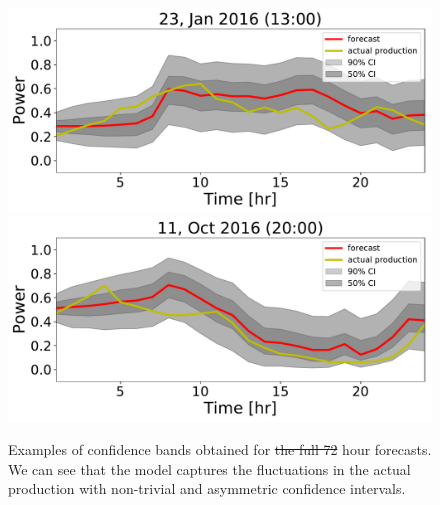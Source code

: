 \documentclass[ima, 20pt, portrait, plainboxedsections]{sciposter}
\providecommand{\DIFadd}[1]{{\protect\color{blue}\uwave{#1}}} %
\providecommand{\DIFdel}[1]{{\protect\color{red}\sout{#1}}}                      %
\providecommand{\DIFaddbegin}{} %
\providecommand{\DIFaddFL}[1]{\DIFadd{#1}} %
\providecommand{\DIFdelFL}[1]{\DIFdel{#1}} %
\providecommand{\DIFaddbeginFL}{} %
\providecommand{\DIFaddendFL}{} %
\providecommand{\DIFdelbeginFL}{} %
\providecommand{\DIFdelendFL}{} %
\begin{document}
\begin{multicols}{3}
\DIFaddbegin \begin{figure}[t]
\begin{center}
  \includegraphics[width=0.8\linewidth]{confidence_intervals/24hr/31.pdf}
  \includegraphics[width=0.8\linewidth]{confidence_intervals/24hr/820.pdf}

\DIFaddendFL \end{center}
  \caption{ Examples of confidence bands obtained for \DIFdelbeginFL \DIFdelFL{the full 72 }\DIFdelendFL \DIFaddbeginFL \DIFaddFL{24 }\DIFaddendFL hour forecasts. We can see that the model captures the fluctuations in the actual production with non-trivial and asymmetric confidence intervals.}
\label{fig:72hr}
\end{figure}


\end{multicols}
\end{document}

